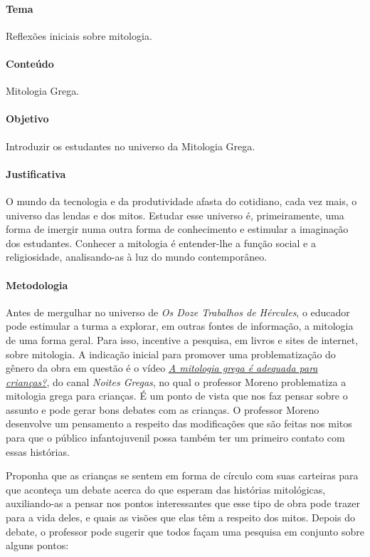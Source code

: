 \documentclass[11pt]{extarticle}
\begin{document}
\paragraph{Tema} Reflexões iniciais sobre mitologia. 

\paragraph{Conteúdo} Mitologia Grega.

\paragraph{Objetivo} Introduzir os estudantes no universo da Mitologia Grega. 

\paragraph{Justificativa} O mundo da tecnologia e da produtividade afasta do cotidiano, cada vez mais, o universo das lendas e dos mitos. Estudar esse universo é, primeiramente, uma forma de imergir numa outra forma de conhecimento e estimular a imaginação dos estudantes. Conhecer a mitologia é entender-lhe a função social e a religiosidade, analisando-as à luz do mundo contemporâneo.  

\paragraph{Metodologia}

Antes de mergulhar no universo de \textit{Os Doze Trabalhos de Hércules}, o educador pode estimular a turma a explorar, em outras fontes de informação, a mitologia de uma forma geral. Para isso, incentive a pesquisa, em livros e sites de internet, sobre mitologia. A indicação inicial para promover uma problematização do gênero da obra em questão é o vídeo \href{https://youtu.be/9qlhKoUj_dw}{\textit{A mitologia grega é adequada para crianças?}}, do canal \textit{Noites Gregas}, no qual o professor Moreno problematiza a mitologia grega para crianças. É um ponto de vista que nos faz pensar sobre o assunto e pode gerar bons debates com as crianças. O professor Moreno desenvolve um pensamento a respeito das modificações que são feitas nos mitos para que o público infantojuvenil possa também ter um primeiro contato com essas histórias. 

Proponha que as crianças se sentem em forma de círculo com suas carteiras para que aconteça um debate acerca do que esperam das histórias mitológicas, auxiliando-as a pensar nos pontos interessantes que esse tipo de obra pode trazer para a vida deles, e quais as visões que elas têm a respeito dos mitos. Depois do debate, o professor pode sugerir que todos façam uma pesquisa em conjunto sobre alguns pontos:
\end{document}
